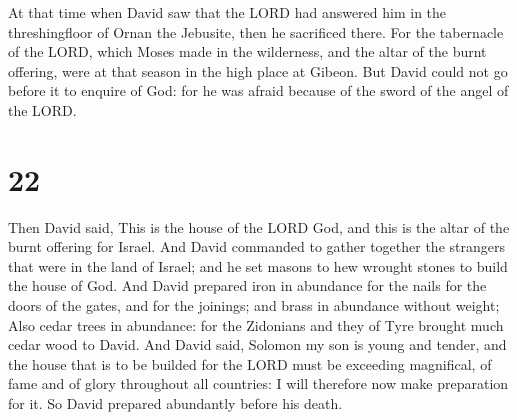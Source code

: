  At that time when David saw that the LORD had answered
him in the threshingfloor of Ornan the Jebusite, then he sacrificed
there.  For the tabernacle of the LORD, which Moses made
in the wilderness, and the altar of the burnt offering, were at that
season in the high place at Gibeon.  But David could not
go before it to enquire of God: for he was afraid because of the sword
of the angel of the LORD.

\hypertarget{section-21}{%
\section{22}\label{section-21}}

 Then David said, This is the house of the LORD God, and
this is the altar of the burnt offering for Israel.  And
David commanded to gather together the strangers that were in the land
of Israel; and he set masons to hew wrought stones to build the house of
God.  And David prepared iron in abundance for the nails
for the doors of the gates, and for the joinings; and brass in abundance
without weight;  Also cedar trees in abundance: for the
Zidonians and they of Tyre brought much cedar wood to David.
 And David said, Solomon my son is young and tender, and
the house that is to be builded for the LORD must be exceeding
magnifical, of fame and of glory throughout all countries: I will
therefore now make preparation for it. So David prepared abundantly
before his death.

